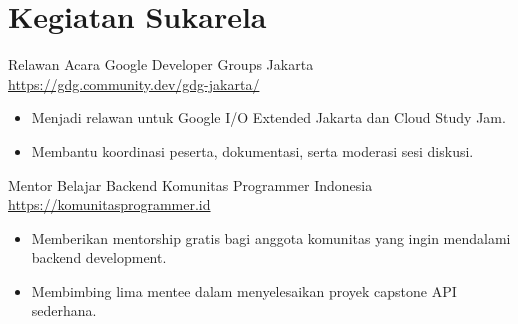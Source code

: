 \documentclass[a4paper, serif, 10pt]{moderncv}
\begin{document}
\section{Kegiatan Sukarela}

        {Relawan Acara}
        {Google Developer Groups Jakarta}
        {\url{https://gdg.community.dev/gdg-jakarta/}}
        {}
        {\begin{itemize}
\item Menjadi relawan untuk Google I/O Extended Jakarta dan Cloud Study Jam.
\item Membantu koordinasi peserta, dokumentasi, serta moderasi sesi diskusi.
\end{itemize}}
    

        {Mentor Belajar Backend}
        {Komunitas Programmer Indonesia}
        {\url{https://komunitasprogrammer.id}}
        {}
        {\begin{itemize}
\item Memberikan mentorship gratis bagi anggota komunitas yang ingin mendalami backend development.
\item Membimbing lima mentee dalam menyelesaikan proyek capstone API sederhana.
\end{itemize}}
    
\end{document}
